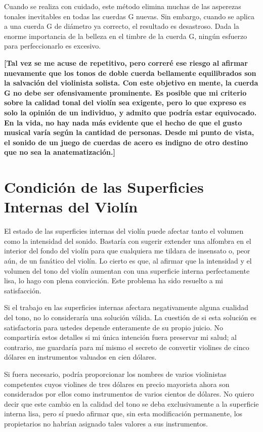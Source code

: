 \documentclass[12pt]{book}
\begin{document}
Cuando se realiza con cuidado, este método elimina muchas de las asperezas tonales inevitables en todas las cuerdas G nuevas. Sin embargo, cuando se aplica a una cuerda G de diámetro ya correcto, el resultado es desastroso. Dada la enorme importancia de la belleza en el timbre de la cuerda G, ningún esfuerzo para perfeccionarlo es excesivo.

\textbf{[Tal vez se me acuse de repetitivo, pero correré ese riesgo al afirmar nuevamente que los tonos de doble cuerda bellamente equilibrados son la salvación del violinista solista. Con este objetivo en mente, la cuerda G no debe ser ofensivamente prominente. Es posible que mi criterio sobre la calidad tonal del violín sea exigente, pero lo que expreso es solo la opinión de un individuo, y admito que podría estar equivocado. En la vida, no hay nada más evidente que el hecho de que el gusto musical varía según la cantidad de personas. Desde mi punto de vista, el sonido de un juego de cuerdas de acero es indigno de otro destino que no sea la anatematización.]}

\section*{Condición de las Superficies Internas del Violín}

El estado de las superficies internas del violín puede afectar tanto el volumen como la intensidad del sonido. Bastaría con sugerir extender una alfombra en el interior del fondo del violín para que cualquiera me tildara de insensato o, peor aún, de un fanático del violín. Lo cierto es que, al afirmar que la intensidad y el volumen del tono del violín aumentan con una superficie interna perfectamente lisa, lo hago con plena convicción. Este problema ha sido resuelto a mi satisfacción. 

Si el trabajo en las superficies internas afectara negativamente alguna cualidad del tono, no lo consideraría una solución válida. La cuestión de si esta solución es satisfactoria para ustedes depende enteramente de su propio juicio. No compartiría estos detalles si mi única intención fuera preservar mi salud; al contrario, me guardaría para mí mismo el secreto de convertir violines de cinco dólares en instrumentos valuados en cien dólares. 

Si fuera necesario, podría proporcionar los nombres de varios violinistas competentes cuyos violines de tres dólares en precio mayorista ahora son considerados por ellos como instrumentos de varios cientos de dólares. No quiero decir que este cambio en la calidad del tono se deba exclusivamente a la superficie interna lisa, pero sí puedo afirmar que, sin esta modificación permanente, los propietarios no habrían asignado tales valores a sus instrumentos. 
\end{document}

